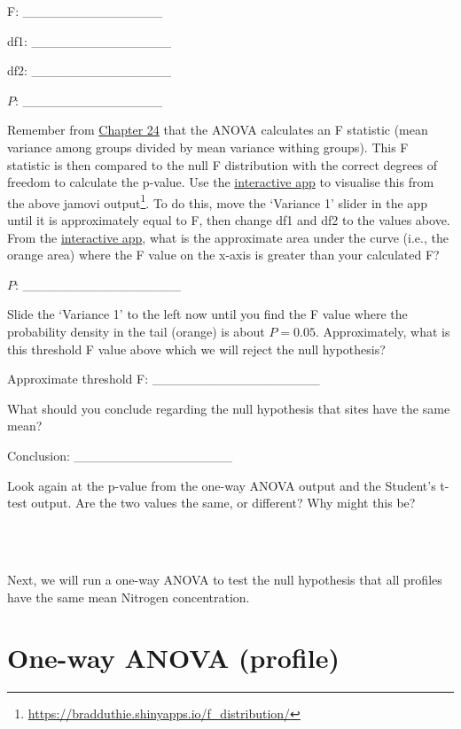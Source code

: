 \documentclass[
]{scrbook}
\begin{document}
F: \_\_\_\_\_\_\_\_\_\_\_\_\_\_\_

df1: \_\_\_\_\_\_\_\_\_\_\_\_\_\_\_

df2: \_\_\_\_\_\_\_\_\_\_\_\_\_\_\_

\(P\): \_\_\_\_\_\_\_\_\_\_\_\_\_\_\_

Remember from \protect\hyperlink{Chapter_24}{Chapter 24} that the ANOVA calculates an F statistic (mean variance among groups divided by mean variance withing groups).
This F statistic is then compared to the null F distribution with the correct degrees of freedom to calculate the p-value.
Use the \href{https://bradduthie.shinyapps.io/f_distribution/}{interactive app} to visualise this from the above jamovi output\footnote{\url{https://bradduthie.shinyapps.io/f_distribution/}}.
To do this, move the `Variance 1' slider in the app until it is approximately equal to F, then change df1 and df2 to the values above.
From the \href{https://bradduthie.shinyapps.io/f_distribution/}{interactive app}, what is the approximate area under the curve (i.e., the orange area) where the F value on the x-axis is greater than your calculated F?

\(P\): \_\_\_\_\_\_\_\_\_\_\_\_\_\_\_\_\_

Slide the `Variance 1' to the left now until you find the F value where the probability density in the tail (orange) is about \(P = 0.05\).
Approximately, what is this threshold F value above which we will reject the null hypothesis?

Approximate threshold F: \_\_\_\_\_\_\_\_\_\_\_\_\_\_\_\_\_\_

What should you conclude regarding the null hypothesis that sites have the same mean?

Conclusion: \_\_\_\_\_\_\_\_\_\_\_\_\_\_\_\_\_

Look again at the p-value from the one-way ANOVA output and the Student's t-test output.
Are the two values the same, or different?
Why might this be?

\begin{verbatim}



\end{verbatim}

Next, we will run a one-way ANOVA to test the null hypothesis that all profiles have the same mean Nitrogen concentration.

\hypertarget{one-way-anova-profile}{%
\section{One-way ANOVA (profile)}\label{one-way-anova-profile}}
\end{document}
